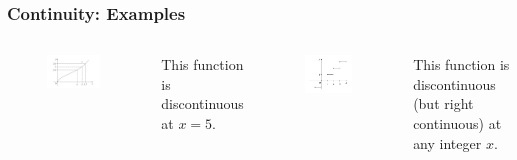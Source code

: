 \documentclass{beamer}
\begin{document}
\begin{frame}
\frametitle{Continuity: Examples}
\begin{columns}[t] %

\vspace*{-0.15in}
\begin{figure}[H]
\centering
\includegraphics[width=6.2cm]{Function-limit-eg.png}
\end{figure}
This function is discontinuous at $x=5$.

\vspace*{-0.15in}
\begin{figure}[H]
\centering
\includegraphics[width=5.5cm]{Function-cont-eg.png}
\end{figure}
\vspace*{-0.1in}
This function is discontinuous (but right continuous) at any integer $x$.

\end{columns}
 \end{frame}

\end{document}
